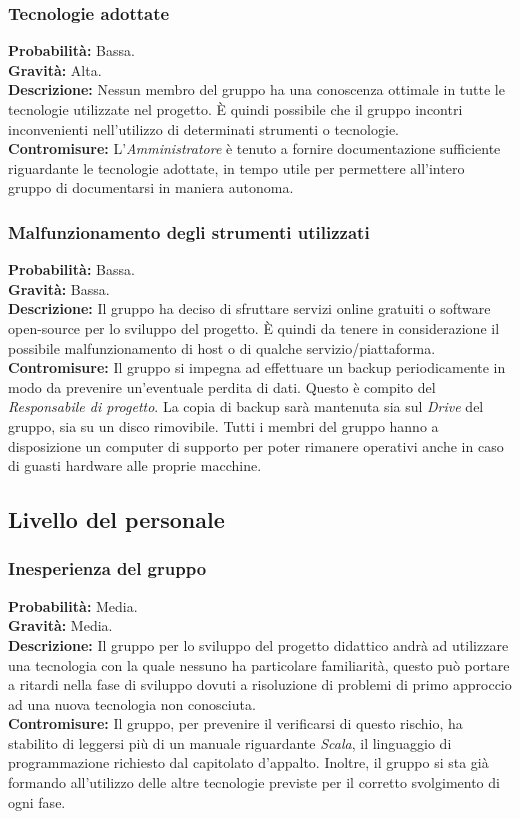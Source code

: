\documentclass[a4paper]{article}
\begin{document}
			\subsubsection{Tecnologie adottate}
				\textbf{Probabilità:} Bassa.
				\\ 
				\textbf{Gravità:} Alta.
				\\ 
				\textbf{Descrizione:} Nessun membro del gruppo ha una conoscenza ottimale in tutte le tecnologie utilizzate nel 
					progetto. È quindi possibile che il gruppo incontri inconvenienti nell'utilizzo 
					di determinati strumenti o tecnologie.
				\\ 
				\textbf{Contromisure:} L'\emph{Amministratore} è tenuto a fornire documentazione sufficiente riguardante 
					le tecnologie adottate, in tempo utile per permettere all'intero gruppo di documentarsi 
					in maniera autonoma.
			\subsubsection{Malfunzionamento degli strumenti utilizzati}
				\textbf{Probabilità:} Bassa.
				\\ 
				\textbf{Gravità:} Bassa.
				\\ 
				\textbf{Descrizione:} Il gruppo ha deciso di sfruttare servizi online gratuiti o software open-source per lo 
					sviluppo del progetto. È quindi da tenere in considerazione il possibile malfunzionamento 
					di host o di qualche servizio/piattaforma.
				\\ 
				\textbf{Contromisure:} Il gruppo si impegna ad effettuare un backup periodicamente in modo da prevenire un'eventuale 
					perdita di dati. Questo è compito del \emph{Responsabile di progetto}. La copia di backup sarà mantenuta 
					sia sul \emph{Drive} del gruppo, sia su un disco rimovibile. Tutti i membri del gruppo hanno a disposizione 
					un computer di supporto per poter rimanere operativi anche in caso di guasti hardware alle proprie macchine.
		\subsection{Livello del personale}
			\subsubsection{Inesperienza del gruppo}
				\textbf{Probabilità:} Media.
				\\ 
				\textbf{Gravità:} Media.
				\\ 
				\textbf{Descrizione:} Il gruppo per lo sviluppo del progetto didattico andrà ad utilizzare una tecnologia 
					con la quale nessuno ha particolare familiarità, questo può portare a ritardi 
					nella fase di sviluppo dovuti a risoluzione di problemi di primo approccio ad una 
					nuova tecnologia non conosciuta.
				\\ 
				\textbf{Contromisure:} Il gruppo, per prevenire il verificarsi di questo rischio, ha stabilito di leggersi
					più di un manuale riguardante \emph{Scala}, il linguaggio di programmazione richiesto
					dal capitolato d'appalto. Inoltre, il gruppo si sta già formando all'utilizzo delle
					altre tecnologie previste per il corretto svolgimento di ogni fase.
\end{document}
